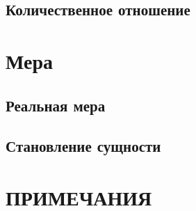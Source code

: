 \documentclass[a5paper, 10pt, twoside, onecolumn, openany]{memoir}
\begin{document}
\section{Количественное отношение}


\chapter{Мера}



\section{Реальная мера}


\section{Становление сущности}


\backmatter


\renewcommand\appendixpagename{ПРИЛОЖЕНИЯ}
\appendixpage*



\chapter[\mdseries Примечания]{ПРИМЕЧАНИЯ}


\clearpage
\tableofcontents*
\clearpage
\end{document}
